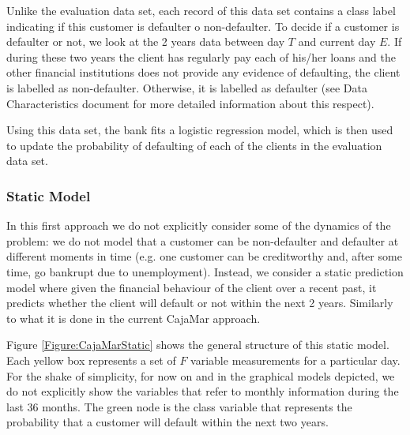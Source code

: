 \begin{itemize}
Unlike the evaluation data set, each record of this data set contains a class label indicating if this customer is defaulter o non-defaulter. To decide if a customer is defaulter or not, we look at the 2 years data between day $T$ and current day $E$. If during these two years the client has regularly pay each of his/her loans and the other financial institutions does not provide any evidence of defaulting, the client is labelled as non-defaulter. Otherwise, it is labelled as defaulter (see Data Characteristics document for more detailed information about this respect).   

Using this data set, the bank fits a logistic regression model, which is then used to update the probability of defaulting of each of the clients in the evaluation data set. 

\end{itemize}




\subsubsection*{Static Model} 

In this first approach we do not explicitly consider some of the dynamics of the problem: we do not model that a customer can be non-defaulter and defaulter at different moments in time (e.g. one customer can be creditworthy and, after some time, go bankrupt due to unemployment). Instead, we consider a static prediction model where given the financial behaviour of the client over a recent past, it predicts whether the client will default or not within the next 2 years. Similarly to what it is done in the current CajaMar approach. 

Figure \ref{Figure:CajaMarStatic} shows the general structure of this static model. Each yellow box represents a set of $F$ variable measurements for a particular day.
For the shake of simplicity, for now on and in the graphical models depicted, we do not explicitly show the variables that refer to monthly information during the last 36 months. The green node is the class variable that represents the probability that a customer will default within the next two years. 

